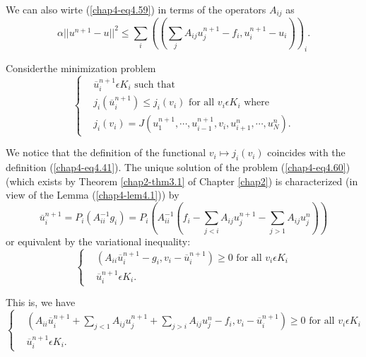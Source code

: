 We can also wirte (\ref{chap4-eq4.59}) in terms of the operators $A_{ij}$ as
\begin{equation*}
\alpha ||u^{n+1}-u||^{2} \leq \sum_{i} ((\sum_{j} A_{ij} u_{j}^{n+1} -f_{i}, u_{i}^{n+1}-u_{i}))_{i}.\tag*{$(4.59)'$}\label{chap4-eq4.59'}
\end{equation*}

Consider\pageoriginale the minimization problem
\begin{equation*}
\begin{cases}
& \overline{u}_{i}^{n+1} \epsilon K_{i} \text{ such that }\\
& j_{i} (\overline{u}_{i}^{n+1}) \leq j_{i} (v_{i}) \text{ for all } v_{i} \epsilon K_{i} \text{ where }\\
& j_{i}(v_{i}) = J(u_{1}^{n+1}, \cdots , u_{i-1}^{n+1}, v_{i}, u_{i+1}^{n}, \cdots, u_{N}^{n}).\tag{4.60}\label{chap4-eq4.60}
\end{cases}
\end{equation*}

We notice that the definition of the functional $v_{i} \mapsto j_{i}(v_{i})$ coincides with the definition (\ref{chap4-eq4.41}). The unique solution of the problem (\ref{chap4-eq4.60}) (which exists by Theorem \ref{chap2-thm3.1} of Chapter \ref{chap2}) is characterized (in view of the Lemma (\ref{chap4-lem4.1})) by
\begin{equation*}
\overline{u}_{i}^{n+1} = P_{i}(A_{ii}^{-1} g_{i}) = P_{i}(A_{ii}^{-1}(f_{i} - \sum\limits_{j<i} A_{ij} u_{j}^{n+1} -\sum\limits_{j>1} A_{ij} u_{j}^{n}))\tag{4.61}\label{chap4-eq4.61}
\end{equation*}
or equivalent by the variational inequality:
\begin{equation*}
\begin{cases}
& (A_{ii} \overline{u}_{i}^{n+1} -g_{i}, v_{i} - \overline{u}_{i}^{n+1}) \geq 0 \text{ for all } v_{i} \epsilon K_{i}\\
& \overline{u}_{i}^{n+1} \epsilon K_{i}.
\end{cases}
\end{equation*}

This is, we have
\begin{equation*}
\begin{cases}
& (A_{ii} \overline{u}_{i}^{n+1} + \sum\limits_{j<1} A_{ij} u_{j}^{n+1} + \sum\limits_{j>i} A_{ij} u_{j}^{n} -f_{i}, v_{i}-\overline{u}_{i}^{n+1}) \geq 0 \text{ for all } v_{i} \epsilon K_{i}\\
& \overline{u}_{i}^{n+1} \epsilon K_{i}.
\end{cases} \tag{4.62} \label{chap4-eq4.62}
\end{equation*}

